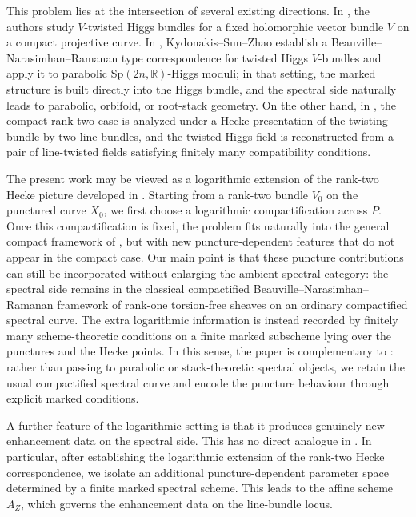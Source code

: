 \documentclass[a4paper,12pt]{amsart}
\numberwithin{equation}{section}
\theoremstyle{definition}
\begin{document}
This problem lies at the intersection of several existing directions. In \cite{GGN}, the authors study \(V\)-twisted Higgs bundles for a fixed holomorphic vector bundle \(V\) on a compact projective curve. In \cite{KSZ}, Kydonakis--Sun--Zhao establish a Beauville--Narasimhan--Ramanan type correspondence for twisted Higgs \(V\)-bundles and apply it to parabolic \(\mathrm{Sp}(2n,\mathbb R)\)-Higgs moduli; in that setting, the marked structure is built directly into the Higgs bundle, and the spectral side naturally leads to parabolic, orbifold, or root-stack geometry. On the other hand, in \cite{ABK}, the compact rank-two case is analyzed under a Hecke presentation of the twisting bundle by two line bundles, and the twisted Higgs field is reconstructed from a pair of line-twisted fields satisfying finitely many compatibility conditions.

The present work may be viewed as a logarithmic extension of the rank-two Hecke picture developed in \cite{ABK}. Starting from a rank-two bundle \(V_0\) on the punctured curve \(X_0\), we first choose a logarithmic compactification across \(P\). Once this compactification is fixed, the problem fits naturally into the general compact framework of \cite{GGN}, but with new puncture-dependent features that do not appear in the compact case. Our main point is that these puncture contributions can still be incorporated without enlarging the ambient spectral category: the spectral side remains in the classical compactified Beauville--Narasimhan--Ramanan framework of rank-one torsion-free sheaves on an ordinary compactified spectral curve. The extra logarithmic information is instead recorded by finitely many scheme-theoretic conditions on a finite marked subscheme lying over the punctures and the Hecke points. In this sense, the paper is complementary to \cite{KSZ}: rather than passing to parabolic or stack-theoretic spectral objects, we retain the usual compactified spectral curve and encode the puncture behaviour through explicit marked conditions.

A further feature of the logarithmic setting is that it produces genuinely new enhancement data on the spectral side. This has no direct analogue in \cite{ABK}. In particular, after establishing the logarithmic extension of the rank-two Hecke correspondence, we isolate an additional puncture-dependent parameter space determined by a finite marked spectral scheme. This leads to the affine scheme \(A_Z\), which governs the enhancement data on the line-bundle locus.

\medskip 
\end{document}
